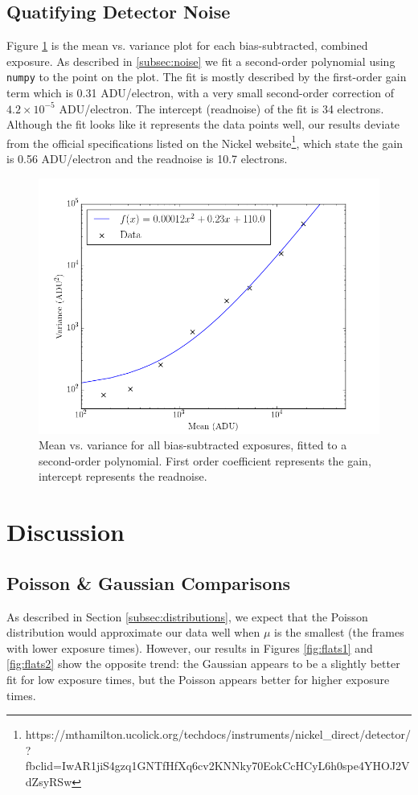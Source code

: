 \documentclass[preprint]{aastex62}
\begin{document}
\subsection{Quatifying Detector Noise} \label{subsec:gain}
Figure \ref{fig:mean_var} is the mean vs. variance plot for each bias-subtracted, combined exposure. As described in \ref{subsec:noise} we fit a second-order polynomial using {\tt numpy} to the point on the plot. The fit is mostly described by the first-order gain term which is 0.31 ADU/electron, with a very small second-order correction of $4.2\times10^{-5}$ ADU/electron. The intercept (readnoise) of the fit is 34 electrons. Although the fit looks like it represents the data points well, our results deviate from the official specifications listed on the Nickel website\footnote{\footnotesize https://mthamilton.ucolick.org/techdocs/instruments/nickel\_direct/detector/ \\?fbclid=IwAR1jiS4gzq1GNTfHfXq6cv2KNNky70EokCcHCyL6h0spe4YHOJ2VdZsyRSw}, which state the gain is 0.56 ADU/electron and the readnoise is 10.7 electrons.

\begin{figure}[H]
\begin{center}
\includegraphics[width=.48\linewidth]{plots/mean_vs_variance.png}
\caption{Mean vs. variance for all bias-subtracted exposures, fitted to a second-order polynomial. First order coefficient represents the gain, intercept represents the readnoise.} \label{fig:mean_var}
\end{center}
\end{figure}

\section{Discussion} \label{sec:discussion}
\subsection{Poisson \& Gaussian Comparisons} \label{subsec:dist_comparisons}
As described in Section \ref{subsec:distributions}, we expect that the Poisson distribution would approximate our data well when $\mu$ is the smallest (the frames with lower exposure times). However, our results in Figures \ref{fig:flats1} and \ref{fig:flats2} show the opposite trend: the Gaussian appears to be a slightly better fit for low exposure times, but the Poisson appears better for higher exposure times.
\end{document}
